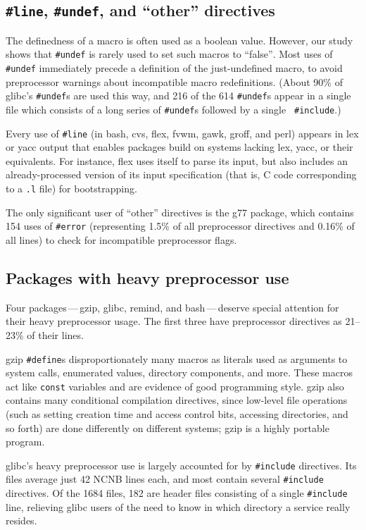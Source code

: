 \documentclass[11pt]{article}
\begin{document}
\subsection{{\tt \#line}, {\tt \#undef}, and ``other'' directives}

The definedness of a macro is often used as a boolean value.  However, our
study shows that {\tt \#undef} is rarely used to set such macros to
``false''$\!$.  Most uses of {\tt \#undef} immediately precede a definition of
the just-undefined macro, to avoid preprocessor warnings about incompatible
macro redefinitions.  (About 90\% of glibc's {\tt \#undef}s are used this
way, and 216 of the 614 {\tt \#undef}s appear in a single file which
consists of a long series of {\tt \#undef}s followed by a single {\tt
\#include}.)

Every use of {\tt \#line} (in bash, cvs, flex, fvwm, gawk, groff, and perl)
appears in lex or yacc output that enables packages build on systems
lacking lex, yacc, or their equivalents.  For instance, flex uses itself to
parse its input, but also includes an already-processed version of its
input specification (that is, C code corresponding to a {\tt .l} file) for
bootstrapping.

The only significant user of ``other'' directives is the g77 package, which
contains 154 uses of {\tt \#error} (representing 1.5\% of all preprocessor
directives and 0.16\% of all lines) to check for incompatible preprocessor
flags.


\subsection{Packages with heavy preprocessor use}

Four packages\,---\,gzip, glibc, remind, and bash\,---\,deserve special
attention for their heavy preprocessor usage.  The first three have
preprocessor directives as 21--23\% of their lines.

gzip {\tt \#define}s disproportionately many macros as literals used as
arguments to system calls, enumerated values, directory components, and
more.  These macros act like {\tt const} variables and are evidence of good
programming style.  gzip also contains many conditional compilation
directives, since low-level file operations (such as setting creation time
and access control bits, accessing directories, and so forth) are done
differently on different systems; gzip is a highly portable program.

glibc's heavy preprocessor use is largely accounted for by {\tt \#include}
directives.  Its files average just 42 NCNB lines each, and most contain
several {\tt \#include} directives.  Of the 1684 files, 182 are header
files consisting of a single {\tt \#include} line, relieving glibc users of
the need to know in which directory a service really resides.
\end{document}
